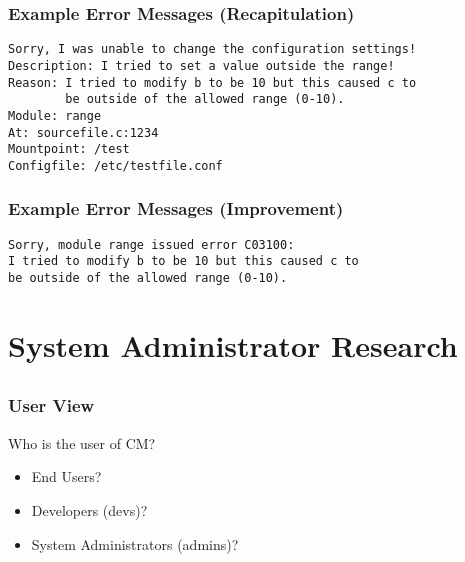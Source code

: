 \begin{frame}[fragile]
	\frametitle{Example Error Messages (Recapitulation)}
\begin{verbatim}
Sorry, I was unable to change the configuration settings!
Description: I tried to set a value outside the range!
Reason: I tried to modify b to be 10 but this caused c to
        be outside of the allowed range (0-10).
Module: range
At: sourcefile.c:1234
Mountpoint: /test
Configfile: /etc/testfile.conf
\end{verbatim}
\end{frame}

\begin{frame}[fragile]
	\frametitle{Example Error Messages (Improvement)}
\begin{verbatim}
Sorry, module range issued error C03100:
I tried to modify b to be 10 but this caused c to
be outside of the allowed range (0-10).
\end{verbatim}
\end{frame}




\section{System Administrator Research}

\subsection{}

\begin{frame}
	\frametitle{User View}

	Who is the user of CM?

	\begin{itemize}[<+-| alert@+>]
	\item End Users?
	\item Developers (devs)?
	\item System Administrators (admins)?
	\end{itemize}
\end{frame}

